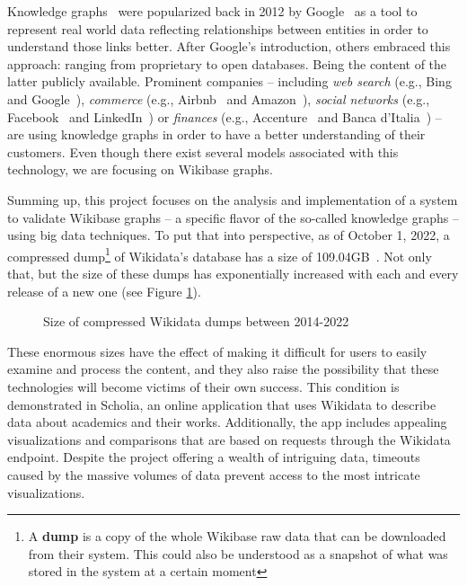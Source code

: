 Knowledge graphs~\cite{https://doi.org/10.48550/arxiv.2110.11709} were popularized back in 2012 by Google~\cite{web:knowledge_graphs:google} as a tool to represent real world data reflecting relationships between entities in order to understand those links better. After Google's introduction, others embraced this approach: ranging from proprietary to open databases. Being the content of the latter publicly available. Prominent companies -- including \textit{web search} (e.g., Bing~\cite{knowledge:graphs:usage:bing} and Google~\cite{web:knowledge_graphs:google}), \textit{commerce} (e.g., Airbnb~\cite{knowledge:graphs:usage:airbnb} and Amazon~\cite{knowledge:graphs:usage:amazon}), \textit{social networks} (e.g., Facebook~\cite{knowledge:graphs:usage:facebook} and LinkedIn~\cite{knowledge:graphs:usage:linkedin}) or \textit{finances} (e.g., Accenture~\cite{knowledge:graphs:usage:accenture} and Banca d'Italia~\cite{https://doi.org/10.48550/arxiv.2010.05172}) -- are using knowledge graphs in order to have a better understanding of their customers. Even though there exist several models associated with this technology, we are focusing on Wikibase graphs.

Summing up, this project focuses on the analysis and implementation of a system to validate Wikibase graphs -- a specific flavor of the so-called knowledge graphs -- using big data techniques. To put that into perspective, as of October 1, 2022, a compressed dump\footnote{A \textbf{dump} is a copy of the whole Wikibase raw data that can be downloaded from their system. This could also be understood as a snapshot of what was stored in the system at a certain moment} of Wikidata's database has a size of 109.04GB~\cite{wikidata:dumps}. Not only that, but the size of these dumps has exponentially increased with each and every release of a new one (see Figure \ref{fig:dumps}).

\begin{figure}[ht]
    \centering
    
    \caption[Plot showing the size of compressed dumps between 2014-22]{Size of compressed Wikidata dumps between 2014-2022~\cite{https://doi.org/10.48550/arxiv.2110.11709}}
    \label{fig:dumps}
\end{figure}

These enormous sizes have the effect of making it difficult for users to easily examine and process the content, and they also raise the possibility that these technologies will become victims of their own success. This condition is demonstrated in Scholia, an online application that uses Wikidata to describe data about academics and their works. Additionally, the app includes appealing visualizations and comparisons that are based on requests through the Wikidata endpoint. Despite the project offering a wealth of intriguing data, timeouts caused by the massive volumes of data prevent access to the most intricate visualizations.

